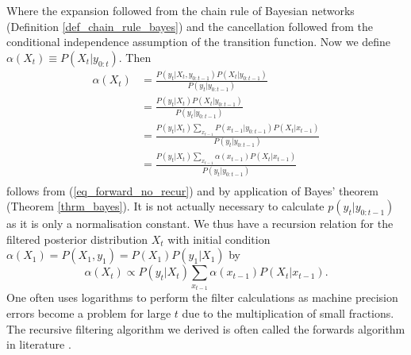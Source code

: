 Where the expansion followed from the chain rule of Bayesian networks (Definition \ref{def_chain_rule_bayes}) and the cancellation followed from the conditional independence assumption of the transition function. Now we define $\alpha(X_t) \equiv P(X_t | y_{0:t})$. Then
\begin{equation}
\begin{aligned}
\alpha(X_t) &= \frac{P(y_t|X_t, y_{0:t-1})P(X_t|y_{0:t-1})}{P(y_t|y_{0:t-1})} \\
& = \frac{P(y_t|X_t)P(X_t|y_{0:t-1})}{P(y_t|y_{0:t-1})} \\
& = \frac{P(y_t|X_t) \sum_{x_{t-1}} P(x_{t-1}|y_{0:t-1})P(X_t|x_{t-1})}{P(y_t|y_{0:t-1})} \\
& = \frac{P(y_t|X_t) \sum_{x_{t-1}} \alpha(x_{t-1})P(X_t|x_{t-1})}{P(y_t|y_{0:t-1})} \\
\end{aligned}
\label{eq_forward_recur}
\end{equation}
follows from (\ref{eq_forward_no_recur}) and by application of Bayes' theorem (Theorem \ref{thrm_bayes}). It is not actually necessary to calculate $p(y_t|y_{0:t-1})$ as it is only a normalisation constant. We thus have a recursion relation for the filtered posterior distribution $X_t$ with initial condition $\alpha(X_1) = P(X_1, y_1) = P(X_1)P(y_1|X_1)$ by
\begin{equation}
\alpha(X_t) \propto P(y_t|X_t) \sum_{x_{t-1}} \alpha(x_{t-1})P(X_t|x_{t-1}).
\label{eq_forward_approx}
\end{equation}
One often uses logarithms to perform the filter calculations as machine precision errors become a problem for large $t$ due to the multiplication of small fractions. The recursive filtering algorithm we derived is often called the forwards algorithm in literature \cite{barber}.


